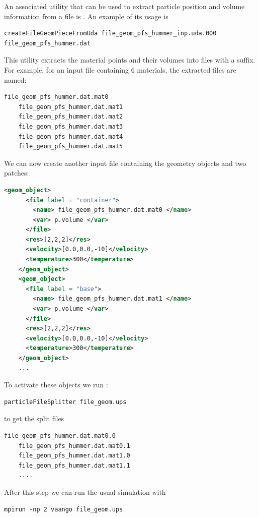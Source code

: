   An associated utility that can be used to extract particle position and
  volume information from a  file is
  . An example of its usage
  is
  \begin{lstlisting}[backgroundcolor=\color{background}]
  createFileGeomPieceFromUda file_geom_pfs_hummer_inp.uda.000 file_geom_pfs_hummer.dat
  \end{lstlisting}
  This utility extracts the material points and their volumes into files with
  a  suffix.  For example, for an input file containing 6 materials,
  the extracted files are named:
  \begin{lstlisting}[backgroundcolor=\color{background}]
    file_geom_pfs_hummer.dat.mat0
    file_geom_pfs_hummer.dat.mat1
    file_geom_pfs_hummer.dat.mat2
    file_geom_pfs_hummer.dat.mat3
    file_geom_pfs_hummer.dat.mat4
    file_geom_pfs_hummer.dat.mat5
  \end{lstlisting}
  We can now create another input file 
  containing the  geometry objects and two patches:
  \begin{lstlisting}[language=XML]
    <geom_object>
      <file label = "container">
        <name> file_geom_pfs_hummer.dat.mat0 </name>
        <var> p.volume </var>
      </file>
      <res>[2,2,2]</res>
      <velocity>[0.0,0.0,-10]</velocity>
      <temperature>300</temperature>
    </geom_object>
    <geom_object>
      <file label = "base">
        <name> file_geom_pfs_hummer.dat.mat1 </name>
        <var> p.volume </var>
      </file>
      <res>[2,2,2]</res>
      <velocity>[0.0,0.0,-10]</velocity>
      <temperature>300</temperature>
    </geom_object>
    ...
  \end{lstlisting}
  To activate these objects we run :
  \begin{lstlisting}[backgroundcolor=\color{background}]
     particleFileSplitter file_geom.ups
  \end{lstlisting}
  to get the split files
  \begin{lstlisting}[backgroundcolor=\color{background}]
    file_geom_pfs_hummer.dat.mat0.0
    file_geom_pfs_hummer.dat.mat0.1
    file_geom_pfs_hummer.dat.mat1.0
    file_geom_pfs_hummer.dat.mat1.1
    ....
  \end{lstlisting}
  After this step we can run the usual \Vaango simulation with
  \begin{lstlisting}[backgroundcolor=\color{background}]
    mpirun -np 2 vaango file_geom.ups
  \end{lstlisting}
  

